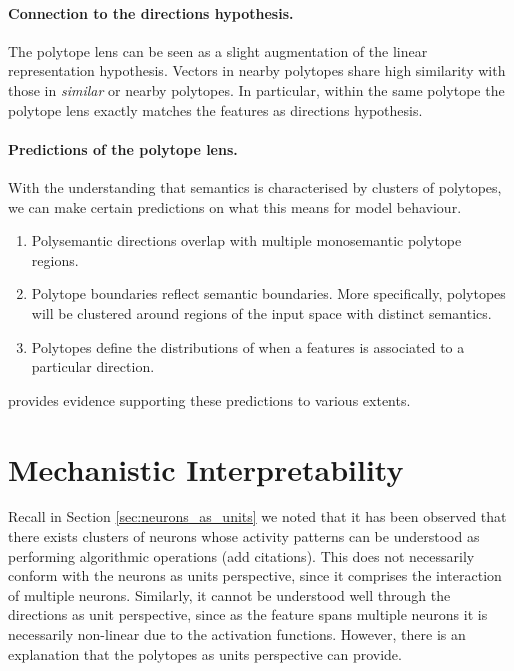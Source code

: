 \paragraph{Connection to the directions hypothesis.}

The polytope lens can be seen as a slight augmentation of the linear representation hypothesis. Vectors in nearby polytopes share high similarity with those in \emph{similar} or nearby polytopes. In particular, within the same polytope the polytope lens exactly matches the features as directions hypothesis.

\paragraph{Predictions of the polytope lens.}

With the understanding that semantics is characterised by clusters of polytopes, we can make certain predictions on what this means for model behaviour.

\begin{enumerate}
    \item Polysemantic directions overlap with multiple monosemantic polytope regions.
    \item Polytope boundaries reflect semantic boundaries. More specifically, polytopes will be clustered around regions of the input space with distinct semantics.
    \item Polytopes define the distributions of when a features is associated to a particular direction. 
\end{enumerate}

\citet{blackInterpretingNeuralNetworks2022} provides evidence supporting these predictions to various extents.

\section{Mechanistic Interpretability}\label{sec:mechanistic_interpretability}

Recall in Section \ref{sec:neurons_as_units} we noted that it has been observed that there exists clusters of neurons whose activity patterns can be understood as performing algorithmic operations (add citations). This does not necessarily conform with the neurons as units perspective, since it comprises the interaction of multiple neurons. Similarly, it cannot be understood well through the directions as unit perspective, since as the feature spans multiple neurons it is necessarily non-linear due to the activation functions. However, there is an explanation that the polytopes as units perspective can provide. 


